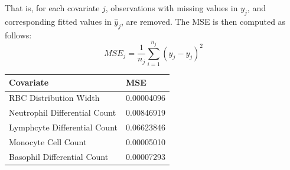 \documentclass[landscape,a0paper,fontscale=0.285]{baposter} %
\begin{document}
\begin{poster}
{That is, for each covariate $j$, observations with missing values in $y_{j}$,
and corresponding fitted values in $\hat{y}_{j}$, are removed. The MSE is then
computed as follows:
$$ MSE_{j} = \frac{1}{n_{j}} \sum_{i = 1}^{n_{j}} (\hat{y}_{j} - y_{j})^{2} $$

\begin{center}
\begin{tabular}{l l}
\toprule
\textbf{Covariate} & \textbf{MSE}\\
\midrule
RBC Distribution Width & 0.00004096 \\
Neutrophil Differential Count & 0.00846919 \\
Lymphcyte Differential Count & 0.06623846 \\
Monocyte Cell Count & 0.00005010 \\
Basophil Differential Count & 0.00007293 \\
\bottomrule
\end{tabular}
\end{center}
}


\end{poster}
\end{document}
